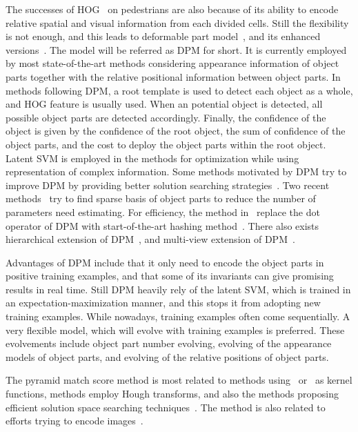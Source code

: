 The successes of HOG~\citep{ij4} on pedestrians are also because of its ability to encode relative spatial and visual information from each divided cells. Still the flexibility is not enough, and this leads to deformable part model~\citep{ac30,dpm1}, and its enhanced versions~\citep{ac31,dpm2}. The model will be referred as DPM for short. It is currently employed by most state-of-the-art methods considering  appearance information of object parts together with the relative positional information between object parts. In methods following DPM, a root template is used to detect each object as a whole, and HOG feature is usually used. When an potential object is detected, all possible object parts are detected accordingly. Finally, the confidence of the object is given by the confidence of the root object, the sum of confidence of the object parts, and the cost to deploy the object parts within the root object. Latent SVM is employed in the methods for optimization while using representation of complex information. Some methods motivated by DPM try to improve DPM by providing better solution searching strategies~\citep{dpm3}.  Two recent methods~\citep{spm,spltm} try to find sparse basis of object parts to reduce the number of parameters need estimating. For efficiency, the method in~\citep{408} replace the dot operator of DPM with start-of-the-art hashing method~\citep{lsh}. There also exists hierarchical extension of DPM~\citep{hdpm}, and multi-view extension of DPM~\citep{mvdpm}.

Advantages of DPM include that it only need to encode the object parts in positive training examples, and that  some of its invariants can give promising results in real time. Still DPM heavily rely of the latent SVM, which is trained in an  expectation-maximization manner, and this stops it from adopting new training examples. While nowadays, training examples often come sequentially. A very flexible model, which will evolve with training examples is preferred. These evolvements include object part number evolving, evolving of the appearance models of object parts, and evolving of the relative positions of object parts.



The pyramid match score method is most related to methods using~\citep{pmk} or~\citep{kmts} as kernel functions, methods employ Hough transforms, and also the methods proposing efficient solution space searching techniques~\citep{bab}. The method is also related to efforts trying to encode images~\citep{spen}.


